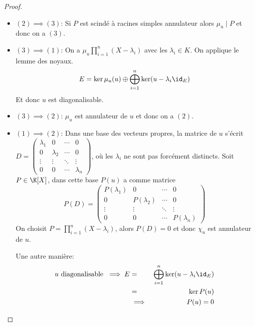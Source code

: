 \begin{proof}
	\begin{itemize}
		\item $(2) \implies (3)$: Si $P$ est scindé à racines simples annulateur alors $\mu_u \mid P$ et donc on a $(3)$.
		\item $(3) \implies (1)$: On a $\mu_u \prod_{i=1}^n (X - \lambda_i)$ avec les $\lambda_i \in K$. On applique le lemme des noyaux.
		      $$ E = \ker \mu_u(u) \oplus \bigoplus_{i=1}^n \ker(u - \lambda_i \id_E) $$
		      Et donc $u$ est diagonalisable.
		\item $(3) \implies (2)$: $\mu_u$ est annulateur de $u$ et donc on a $(2)$.
		\item $(1) \implies (2)$: Dans une base des vecteurs propres, la matrice de $u$ s'écrit $D = \begin{pmatrix}
				      \lambda_1 & 0         & \cdots & 0         \\
				      0         & \lambda_2 & \cdots & 0         \\
				      \vdots    & \vdots    & \ddots & \vdots    \\
				      0         & 0         & \cdots & \lambda_n
			      \end{pmatrix}$, où les $\lambda_i$ ne sont pas forcément distincts.
		      Soit $P \in \K[X]$, dans cette base $P(u)$ a comme matrice
		      $$P(D) = \begin{pmatrix}
				      P(\lambda_1) & 0            & \cdots & 0            \\
				      0            & P(\lambda_2) & \cdots & 0            \\
				      \vdots       & \vdots       & \ddots & \vdots       \\
				      0            & 0            & \cdots & P(\lambda_n)
			      \end{pmatrix}$$
		      On choisit $P = \prod_{i=1}^n (X - \lambda_i)$, alors $P(D) = 0$ et donc $\chi_u$ est annulateur de $u$.

		      Une autre manière:
		      \begin{eqnarray*}
			      u \text{ diagonalisable } \implies E &=& \bigoplus_{i=1}^n \ker(u - \lambda_i \id_E) \\
			      &=& \ker P(u) \\
			      &\implies& P(u) = 0
		      \end{eqnarray*}
	\end{itemize}
\end{proof}

